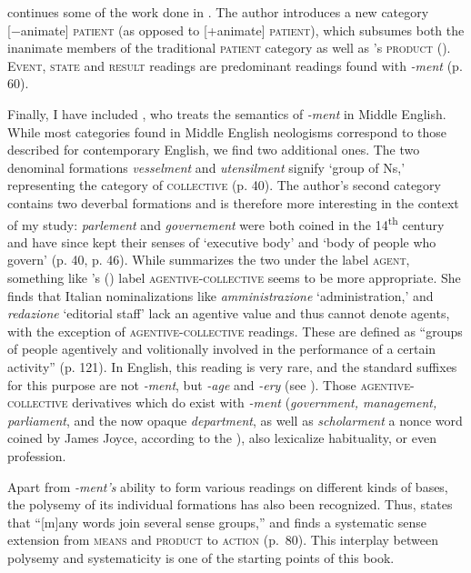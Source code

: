 \citet{Lieber.2016} continues some of the work done in \citet{Bauer.2013}. The author introduces a new category [−animate] \textsc{patient} (as opposed to [+animate] \textsc{patient}), which subsumes both the inanimate members of the traditional \textsc{patient} category as well as \citeauthor{Bauer.2013}'s \textsc{product} (\citealt[19]{Lieber.2016}). \textsc{Event, state} and \textsc{result} readings are predominant readings found with \textit{-ment} (p. 60).

Finally, I have included \citet{Lloyd.2011}, who treats the semantics of \textit{-ment} in Middle English. While most categories found in Middle English neologisms correspond to those described for contemporary English, we find two additional ones. The two denominal formations \textit{vesselment} and \textit{utensilment} signify `group of Ns,' representing the category of \textsc{collective} (p. 40). The author's second category contains two deverbal formations and is therefore more interesting in the context of my study: \textit{parlement} and \textit{governement} were both coined in the 14\textsuperscript{th} century and have since kept their senses of `executive body' and `body of people who govern' (p. 40, p. 46). While \citet{Lloyd.2011} summarizes the two under the label \textsc{agent}, something like \citeauthor{Melloni.2011}'s (\citeyear{Melloni.2011}) label \textsc{agentive-collective} seems to be more appropriate. She finds that Italian nominalizations like \textit{amministrazione} `administration,' and \textit{redazione} `editorial staff' lack an agentive value and thus cannot denote agents, with the exception of \textsc{agentive-collective} readings. These are defined as ``groups of people agentively and volitionally involved in the performance of a certain activity'' (p. 121). In English, this reading is very rare, and the standard suffixes for this purpose are not \textit{-ment}, but \textit{-age} and \textit{-ery} (see \citealt[148 ff.]{Lieber.2004}). Those \textsc{agentive-collective} derivatives which do exist with \textit{-ment} (\textit{government, management, parliament}, and the now opaque \textit{department}, as well as \textit{scholarment}  \textendash{}  a nonce word coined by James Joyce, according to the ), also lexicalize habituality, or even profession.

Apart from \textit{-ment's} ability to form various readings on different kinds of bases, the polysemy of its individual formations has also been recognized. Thus, \citet[332]{Marchand.1969} states that ``[m]any words join several sense groups,'' and \citet{Gadde.1910} finds a systematic sense extension from \textsc{means} and \textsc{product} to \textsc{action} \mbox{(p. 80)}. This interplay between polysemy and systematicity is one of the starting points of this book. 

